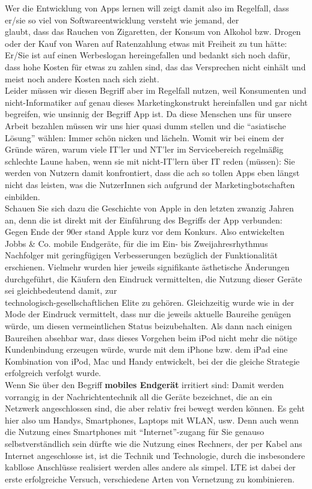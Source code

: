 Wer die Entwicklung von Apps lernen will zeigt damit also im Regelfall, dass er/sie so viel von Softwareentwicklung versteht wie jemand, der\\glaubt, dass das Rauchen von Zigaretten, der Konsum von Alkohol bzw. Drogen oder der Kauf von Waren auf Ratenzahlung etwas mit Freiheit zu tun hätte: Er/Sie ist auf einen Werbeslogan hereingefallen und bedankt sich noch dafür, dass hohe Kosten für etwas zu zahlen sind, das das Versprechen nicht einhält und meist noch andere Kosten nach sich zieht. \\

Leider müssen wir diesen Begriff aber im Regelfall nutzen, weil Konsumenten und nicht-Informatiker auf genau dieses Marketingkonstrukt hereinfallen und gar nicht begreifen, wie unsinnig der Begriff App ist. Da diese Menschen uns für unsere Arbeit bezahlen müssen wir uns hier quasi dumm stellen und die "`asiatische Lösung"' wählen: Immer schön nicken und lächeln. Womit wir bei einem der Gründe wären, warum viele IT’ler und NT’ler im Servicebereich regelmäßig schlechte Laune haben, wenn sie mit nicht-IT’lern über IT reden (müssen): Sie werden von Nutzern damit konfrontiert, dass die ach so tollen Apps eben längst nicht das leisten, was die NutzerInnen sich aufgrund der Marketingbotschaften einbilden.\\

Schauen Sie sich dazu die Geschichte von Apple in den letzten zwanzig Jahren an, denn die ist direkt mit der Einführung des Begriffs der App verbunden: Gegen Ende der 90er stand Apple kurz vor dem Konkurs. Also entwickelten Jobbs \& Co. mobile Endgeräte, für die im Ein- bis Zweijahresrhythmus Nachfolger mit geringfügigen Verbesserungen bezüglich der Funktionalität erschienen. Vielmehr wurden hier jeweils signifikante ästhetische Änderungen durchgeführt, die Käufern den Eindruck vermittelten, die Nutzung dieser Geräte sei gleichbedeutend damit, zur \\technologisch-gesellschaftlichen Elite zu gehören. Gleichzeitig wurde wie in der Mode der Eindruck vermittelt, dass nur die jeweils aktuelle Baureihe genügen würde, um diesen vermeintlichen Status beizubehalten. Als dann nach einigen Baureihen absehbar war, dass dieses Vorgehen beim iPod nicht mehr die nötige Kundenbindung erzeugen würde, wurde mit dem iPhone bzw. dem iPad eine Kombination von iPod, Mac und Handy entwickelt, bei der die gleiche Strategie erfolgreich verfolgt wurde. \\

Wenn Sie über den Begriff \textbf{mobiles Endgerät} irritiert sind: Damit werden vorrangig in der Nachrichtentechnik all die Geräte bezeichnet, die an ein Netzwerk angeschlossen sind, die aber relativ frei bewegt werden können. Es geht hier also um Handys, Smartphones, Laptops mit WLAN, usw. Denn auch wenn die Nutzung eines Smartphones mit "`Internet"'-zugang für Sie genauso selbstverständlich sein dürfte wie die Nutzung eines Rechners, der per Kabel ans Internet angeschlosse ist, ist die Technik und Technologie, durch die insbesondere kabllose Anschlüsse realisiert werden alles andere als simpel. LTE ist dabei der erste erfolgreiche Versuch, verschiedene Arten von Vernetzung zu kombinieren.\\

